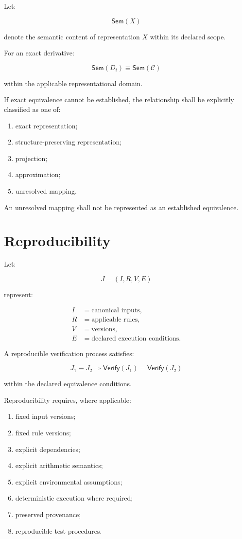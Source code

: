 \documentclass[11pt]{article}
\newcommand{\Spec}{\mathcal{C}}
\newcommand{\Verify}{\mathsf{Verify}}
\newcommand{\Sem}{\mathsf{Sem}}
\begin{document}
Let:

\[
\Sem(X)
\]

denote the semantic content of representation $X$ within its
declared scope.

For an exact derivative:

\[
\boxed{
\Sem(D_i)\equiv\Sem(\Spec)
}
\]

within the applicable representational domain.

If exact equivalence cannot be established, the relationship shall
be explicitly classified as one of:

\begin{enumerate}
    \item exact representation;
    \item structure-preserving representation;
    \item projection;
    \item approximation;
    \item unresolved mapping.
\end{enumerate}

An unresolved mapping shall not be represented as an established
equivalence.

\section{Reproducibility}

Let:

\[
J=(I,R,V,E)
\]

represent:

\begin{align*}
I &= \text{canonical inputs},\\
R &= \text{applicable rules},\\
V &= \text{versions},\\
E &= \text{declared execution conditions}.
\end{align*}

A reproducible verification process satisfies:

\[
\boxed{
J_1\equiv J_2
\Rightarrow
\Verify(J_1)=\Verify(J_2)
}
\]

within the declared equivalence conditions.

Reproducibility requires, where applicable:

\begin{enumerate}
    \item fixed input versions;
    \item fixed rule versions;
    \item explicit dependencies;
    \item explicit arithmetic semantics;
    \item explicit environmental assumptions;
    \item deterministic execution where required;
    \item preserved provenance;
    \item reproducible test procedures.
\end{enumerate}
\end{document}
